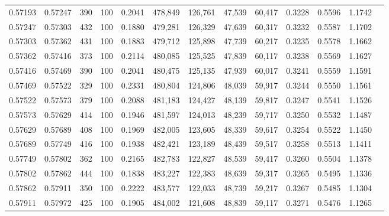\begin{tabular}{rrrrrrrrrrrrr}
0.57193 & 0.57247 &   390 & 100 &                                     0.2041 & 478,849 & 126,761 &  47,539 &  60,417 & 0.3228 & 0.5596 & 1.1742 \\
0.57247 & 0.57303 &   432 & 100 &                                     0.1880 & 479,281 & 126,329 &  47,639 &  60,317 & 0.3232 & 0.5587 & 1.1702 \\
0.57303 & 0.57362 &   431 & 100 &                                     0.1883 & 479,712 & 125,898 &  47,739 &  60,217 & 0.3235 & 0.5578 & 1.1662 \\
0.57362 & 0.57416 &   373 & 100 &                                     0.2114 & 480,085 & 125,525 &  47,839 &  60,117 & 0.3238 & 0.5569 & 1.1627 \\
0.57416 & 0.57469 &   390 & 100 &                                     0.2041 & 480,475 & 125,135 &  47,939 &  60,017 & 0.3241 & 0.5559 & 1.1591 \\
0.57469 & 0.57522 &   329 & 100 &                                     0.2331 & 480,804 & 124,806 &  48,039 &  59,917 & 0.3244 & 0.5550 & 1.1561 \\
0.57522 & 0.57573 &   379 & 100 &                                     0.2088 & 481,183 & 124,427 &  48,139 &  59,817 & 0.3247 & 0.5541 & 1.1526 \\
0.57573 & 0.57629 &   414 & 100 &                                     0.1946 & 481,597 & 124,013 &  48,239 &  59,717 & 0.3250 & 0.5532 & 1.1487 \\
0.57629 & 0.57689 &   408 & 100 &                                     0.1969 & 482,005 & 123,605 &  48,339 &  59,617 & 0.3254 & 0.5522 & 1.1450 \\
0.57689 & 0.57749 &   416 & 100 &                                     0.1938 & 482,421 & 123,189 &  48,439 &  59,517 & 0.3258 & 0.5513 & 1.1411 \\
0.57749 & 0.57802 &   362 & 100 &                                     0.2165 & 482,783 & 122,827 &  48,539 &  59,417 & 0.3260 & 0.5504 & 1.1378 \\
0.57802 & 0.57862 &   444 & 100 &                                     0.1838 & 483,227 & 122,383 &  48,639 &  59,317 & 0.3265 & 0.5495 & 1.1336 \\
0.57862 & 0.57911 &   350 & 100 &                                     0.2222 & 483,577 & 122,033 &  48,739 &  59,217 & 0.3267 & 0.5485 & 1.1304 \\
0.57911 & 0.57972 &   425 & 100 &                                     0.1905 & 484,002 & 121,608 &  48,839 &  59,117 & 0.3271 & 0.5476 & 1.1265 \\

\end{tabular}
